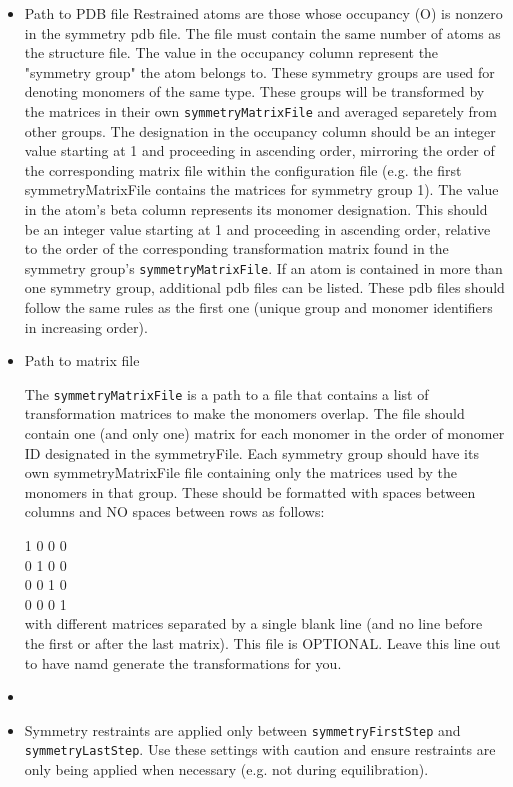\begin{itemize}
\item
{}
{Path to PDB file}
{
Restrained atoms are those whose occupancy (O) is nonzero in the symmetry pdb file.
The file must contain the same number of atoms as the structure file.  The value in
the occupancy column represent the "symmetry group" the atom belongs to.  These symmetry
groups are used for denoting monomers of the same type.  These groups will be transformed by the
matrices in their own {\tt symmetryMatrixFile} and averaged separetely from other groups.  
The designation in the occupancy column should be an integer value starting at 1 and proceeding
in ascending order, mirroring the order of the corresponding matrix file within the configuration file
(e.g. the first symmetryMatrixFile contains the matrices for symmetry group 1).  
The value in the atom's beta column represents its monomer designation.  This should be an integer
value starting at 1 and proceeding in ascending order, relative to the order of the corresponding
transformation matrix found in the symmetry group's {\tt symmetryMatrixFile}.
If an atom is contained in more than one symmetry group, additional pdb files can be listed.
These pdb files should follow the same rules as the first one (unique group and monomer identifiers
in increasing order).  
}

\item
{}
{Path to matrix file}
{
The {\tt symmetryMatrixFile} is a path to a file that contains a list of transformation
matrices to make the monomers overlap.  The file should contain one (and only one)
matrix for each monomer in the order of monomer ID designated in the symmetryFile.
Each symmetry group should have its own symmetryMatrixFile file containing only the matrices
used by the monomers in that group.  
These should be formatted with spaces between columns and
NO spaces between rows as follows:

1 0 0 0 \\
0 1 0 0 \\
0 0 1 0 \\ 
0 0 0 1 \\

with different matrices separated by a single blank line (and no line before the first or after
the last matrix).  This file is
OPTIONAL.  Leave this line out to have namd generate the transformations
for you.
}
\item
{} {}
\item
{}
{ Symmetry restraints are applied only between {\tt symmetryFirstStep} and {\tt symmetryLastStep}.
Use these settings with caution and ensure restraints are only being applied when necessary (e.g. not
during equilibration).  }

\end{itemize}

